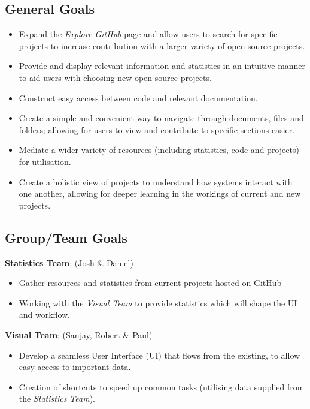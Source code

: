 \documentclass[12pt]{article}
\begin{document}
\subsection{General Goals}
\begin{itemize}
\item Expand the \emph{Explore GitHub} page and allow users to search for specific projects to increase contribution with a larger variety of open source projects.
\item Provide and display relevant information and statistics in an intuitive manner to aid users with choosing new open source projects.
\item Construct easy access between code and relevant documentation.
\item Create a simple and convenient way to navigate through documents, files and folders; allowing for users to view and contribute to specific sections easier.
\item Mediate a wider variety of resources (including statistics, code and projects) for utilisation.
\item Create a holistic view of projects to understand how systems interact with one another, allowing for deeper learning in the workings of current and new projects.
\end{itemize}
\subsection{Group/Team Goals}
\textbf{Statistics Team}: (Josh \& Daniel)
\begin{itemize}
\item Gather resources and statistics from current projects hosted on GitHub
\item Working with the \emph{Visual Team} to provide statistics which will shape the UI and workflow.
\end{itemize}
\textbf{Visual Team}: (Sanjay, Robert \& Paul)
\begin{itemize}
\item Develop a seamless User Interface (UI) that flows from the existing, to allow easy access to important data.
\item Creation of shortcuts to speed up common tasks (utilising data supplied from the \emph{Statistics Team}).
\end{itemize}
\end{document}
